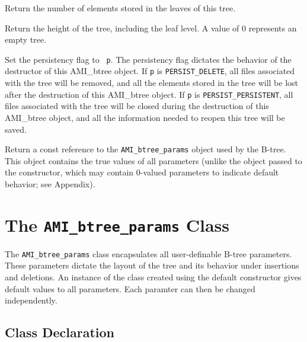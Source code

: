 
    {Return the number of elements
   stored in the leaves of this tree.}

    {Return the height of the tree, including
   the leaf level. A value of $0$ represents an empty tree.}

    {Set the persistency flag to {\tt
   p}. The persistency flag dictates the behavior of the destructor of
   this AMI\_btree object. If {\tt p} is {\tt PERSIST\_DELETE}, all files
   associated with the tree will be removed, and all the elements stored in
   the tree will be lost after the destruction of this AMI\_btree object. If
   {\tt p} is {\tt PERSIST\_PERSISTENT}, all files associated with the tree
   will be closed during the destruction of this AMI\_btree object, and all the
   information needed to reopen this tree will be saved.}

    {Return a const
   reference to the {\tt AMI\_btree\_params} object used by the B-tree. This
   object contains the true values of all parameters (unlike the object
   passed to the constructor, which may contain $0$-valued parameters to
   indicate default behavior; see Appendix).}
\etabb

\section{The {\tt AMI\_btree\_params} Class}
The {\tt AMI\_btree\_params} class encapsulates all user-definable B-tree
parameters. These parameters dictate the layout of the tree and its
behavior under insertions and deletions. An instance of the class created
using the default constructor gives default values to all parameters. Each
paramter can then be changed independently.

\subsection{Class Declaration}

\btabb


